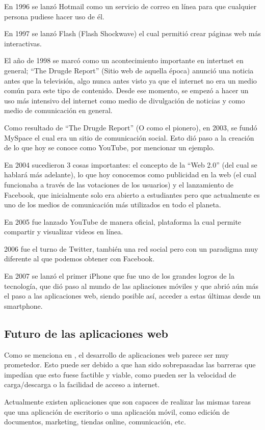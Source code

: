 \documentclass{article}
\begin{document}
En 1996 se lanzó Hotmail como un servicio de correo en línea para que cualquier
persona pudiese hacer uso de él.

En 1997 se lanzó Flash (Flash Shockwave) el cual permitió crear páginas web
más interactivas.

El año de 1998 se marcó como un acontecimiento importante en intertnet en
general; ``The Drugde Report'' (Sitio web de aquella época) anunció una noticia
antes que la televisión, algo nunca antes visto ya que el internet no era un
medio común para este tipo de contenido. Desde ese momento, se empezó a hacer
un uso más intensivo del internet como medio de divulgación de noticias y como
medio de comunicación en general.

Como resultado de ``The Drugde Report'' (O como el pionero), en 2003, se fundó
MySpace el cual era un sitio de comunicación social. Esto dió paso a la creación
de lo que hoy se conoce como YouTube, por mencionar un ejemplo.

En 2004 sucedieron 3 cosas importantes: el concepto de la ``Web 2.0'' (del cual
se hablará más adelante), lo que hoy conocemos como publicidad en la web (el cual
funcionaba a través de las votaciones de los usuarios) y el lanzamiento de
Facebook, que inicialmente solo era abierto a estudiantes pero que actualmente
es uno de los medios de comunicación más utilizados en todo el planeta.

En 2005 fue lanzado YouTube de manera oficial, plataforma la cual permite
compartir y visualizar videos en línea.

2006 fue el turno de Twitter, también una red social pero con un paradigma muy
diferente al que podemos obtener con Facebook.

En 2007 se lanzó el primer iPhone que fue uno de los grandes logros de la
tecnología, que dió paso al mundo de las apliaciones móviles y que abrió aún
más el paso a las aplicaciones web, siendo posible así, acceder a estas últimas
desde un smartphone.

\subsection{Futuro de las aplicaciones web}
Como se menciona en \cite{um}, el desarrollo de aplicaciones web parece ser muy
prometedor. Esto puede ser debido a que han sido sobrepasadas las barreras que
impedían que esto fuese factible y viable, como pueden ser la velocidad de
carga/descarga o la facilidad de acceso a internet.

Actualmente existen aplicaciones que son capaces de realizar las mismas tareas
que una aplicación de escritorio o una aplicación móvil, como edición de
documentos, marketing, tiendas online, comunicación, etc.
\end{document}
